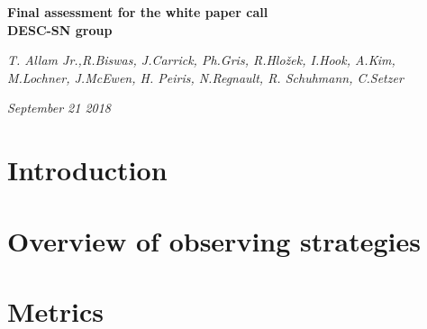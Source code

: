 \documentclass [11pt,a4paper]{article}
\begin{document}
\renewcommand\appendix{\par
  \setcounter{section}{0}
  \setcounter{subsection}{0}
  \setcounter{figure}{0}
  \setcounter{table}{0}
  \renewcommand\thesection{Appendix} %
  \renewcommand\thefigure{\Alph{section}\arabic{figure}}
  \renewcommand\thetable{\Alph{section}\arabic{table}} 
}

\begin{titlepage}
   \begin{center}
      \Large\textbf{Final assessment for the white paper call}\\
        \vspace*{0.5cm}
      \Large\textbf{DESC-SN group} \\
      
		  \vspace*{0.5cm}

      \large\textit{T. Allam Jr.,R.Biswas, J.Carrick, Ph.Gris, R.Hlo\v{z}ek, I.Hook, A.Kim, M.Lochner, J.McEwen, H. Peiris, N.Regnault, R. Schuhmann, C.Setzer} \\
	\vspace*{0.5cm}

      \large\textit{September 21 2018}
   \end{center}
\end{titlepage}


\tableofcontents


\section{Introduction}




\section{Overview of observing strategies}




\section{Metrics}








\end{document}
